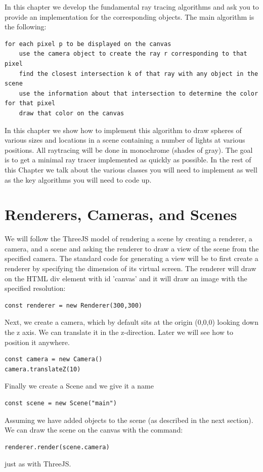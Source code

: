 \documentclass{book}
\begin{document}
In this chapter we develop the fundamental ray tracing algorithms and ask you to provide an implementation for the corresponding objects. The main algorithm is the following:
\begin{verbatim}
for each pixel p to be displayed on the canvas
    use the camera object to create the ray r corresponding to that pixel
    find the closest intersection k of that ray with any object in the scene
    use the information about that intersection to determine the color for that pixel
    draw that color on the canvas
\end{verbatim}
In this chapter we show how to implement this algorithm to draw spheres of various sizes and locations in a scene containing a number of lights at various positions.  All raytracing will be done in monochrome (shades of gray). The goal is to get a minimal ray tracer implemented as quickly as possible. In the rest of this Chapter we talk about the various classes you will need to implement as well as the key algorithms you will need to code up.

\section{Renderers, Cameras, and Scenes}
We will follow the ThreeJS model of rendering a scene by creating a renderer, a camera, and a scene and asking the renderer to draw a view of the scene from the specified camera. The standard code for generating a view will be
to first create a renderer by specifying the dimension of its virtual screen. The renderer will draw on the HTML div element with id 'canvas' and it will draw an image with the specified resolution:
\begin{verbatim}
const renderer = new Renderer(300,300)
\end{verbatim}
Next, we create a camera, which by default sits at the origin (0,0,0) looking down the z axis. We can translate it in the z-direction. Later we will see how to position it anywhere.
\begin{verbatim}
const camera = new Camera()
camera.translateZ(10)
\end{verbatim}
Finally we create a Scene and we give it a name
\begin{verbatim}
const scene = new Scene("main")
\end{verbatim}
Assuming we have added objects to the scene (as described in the next section). We can draw the scene on the canvas with the command:
\begin{verbatim}
renderer.render(scene.camera)
\end{verbatim}
just as with ThreeJS.
\end{document}
